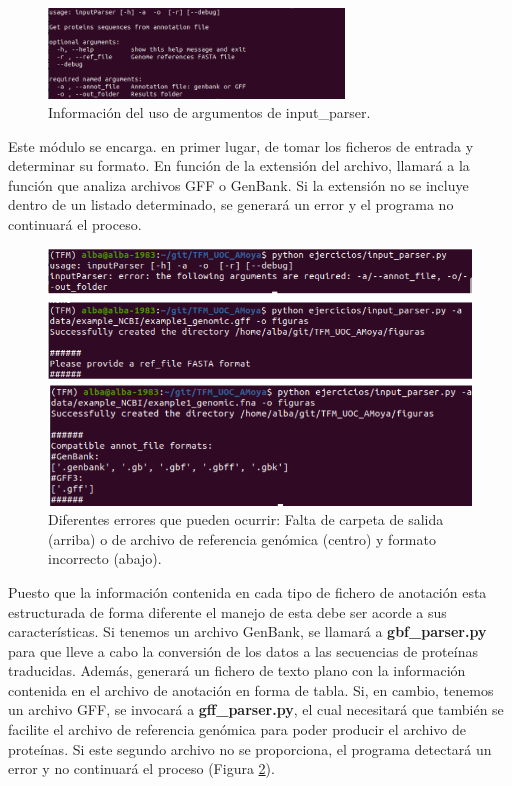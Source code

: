 \begin{figure}[h]
\centering
    \includegraphics[width=0.7\textwidth]{figs/usage_input_parser.png}
    \caption[Información del uso de input\parser en la terminal]{Información del uso de argumentos de input\_parser.}
    \label{fig:usage_input_parser}
\end{figure}


Este módulo se encarga. en primer lugar, de tomar los ficheros de entrada y determinar su formato. En función de la extensión del archivo, llamará a la función que analiza archivos GFF o GenBank. Si la extensión no se incluye dentro de un listado determinado, se generará un error y el programa no continuará el proceso. 

\begin{figure}[h]
	\centering
	\captionsetup{width=0.7\linewidth} 
	\includegraphics[width=0.7\linewidth]{figs/error_input_parser.png}
	\caption[Errores en input\_parser.py]{Diferentes errores que pueden ocurrir: Falta de carpeta de salida (arriba) o de archivo de referencia genómica (centro) y formato incorrecto (abajo).}
	\label{fig:error_input_parser}
\end{figure}

Puesto que la información contenida en cada tipo de fichero de anotación esta estructurada de forma diferente el manejo de esta debe ser acorde a sus características. Si tenemos un archivo GenBank, se llamará a \textbf{gbf\_parser.py} para que lleve a cabo la conversión de los datos a las secuencias de proteínas traducidas. Además, generará un fichero de texto plano con la información contenida en el archivo de anotación en forma de tabla. Si, en cambio, tenemos un archivo GFF, se invocará a \textbf{gff\_parser.py}, el cual necesitará que también se facilite el archivo de referencia genómica para poder producir el archivo de proteínas. Si este segundo archivo no se proporciona, el programa detectará un error y no continuará el proceso (Figura \ref{fig:error_input_parser}).


